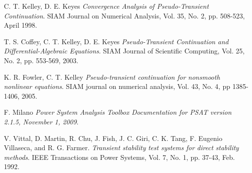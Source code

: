 \documentclass[journal]{IEEEtran}
\begin{document}
\begin{thebibliography}{1}
C. T. Kelley, D. E. Keyes {\em Convergence Analysis of Pseudo-Transient Continuation}.
\newblock SIAM Journal on Numerical Analysis, Vol. 35, No. 2, pp. 508-523, April 1998.

T. S. Coffey, C. T. Kelley, D. E. Keyes {\em Pseudo-Transient Continuation and Differential-Algebraic Equations}.
\newblock SIAM Journal of Scientific Computing, Vol. 25, No. 2, pp. 553-569, 2003.

K. R. Fowler, C. T. Kelley {\em Pseudo-transient continuation for nonsmooth nonlinear equations}.
\newblock SIAM journal on numerical analysis, Vol. 43, No. 4, pp 1385-1406, 2005.


F. Milano {\em Power System Analysis Toolbox Documentation for PSAT version 2.1.5, November 1, 2009}.

V. Vittal, D. Martin, R. Chu, J. Fish, J. C. Giri, C. K. Tang, F. Eugenio Villaseca, and R. G. Farmer.
{\em Transient stability test systems for direct stability methods}.
\newblock IEEE Transactions on Power Systems, Vol. 7, No. 1, pp. 37-43, Feb. 1992.



\end{thebibliography}
\end{document}
